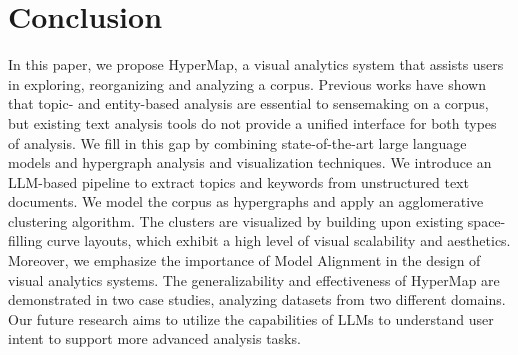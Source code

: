 \section{Conclusion}
In this paper, we propose HyperMap, a visual analytics system that assists users in exploring, reorganizing and analyzing a corpus.
Previous works have shown that topic- and entity-based analysis are essential to sensemaking on a corpus,
but existing text analysis tools do not provide a unified interface for both types of analysis.
We fill in this gap by combining state-of-the-art large language models and hypergraph analysis and visualization techniques.
We introduce an LLM-based pipeline to extract topics and keywords from unstructured text documents.
We model the corpus as hypergraphs and apply an agglomerative clustering algorithm.
The clusters are visualized by building upon existing space-filling curve layouts, which exhibit a high level of visual scalability and aesthetics.
Moreover, we emphasize the importance of Model Alignment in the design of visual analytics systems.
The generalizability and effectiveness of HyperMap are demonstrated in two case studies, analyzing datasets from two different domains.
Our future research aims to utilize the capabilities of LLMs to understand user intent to support more advanced analysis tasks.



